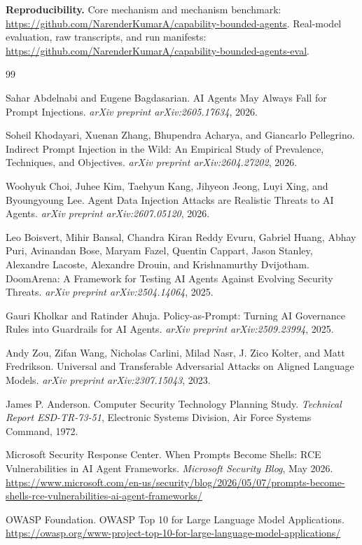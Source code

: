 \documentclass[11pt]{article}
\begin{document}
\bigskip
\noindent\textbf{Reproducibility.} Core mechanism and mechanism benchmark:
\url{https://github.com/NarenderKumarA/capability-bounded-agents}. Real-model evaluation,
raw transcripts, and run manifests:
\url{https://github.com/NarenderKumarA/capability-bounded-agents-eval}.

\begin{thebibliography}{99}

Sahar Abdelnabi and Eugene Bagdasarian.
\newblock AI Agents May Always Fall for Prompt Injections.
\newblock \emph{arXiv preprint arXiv:2605.17634}, 2026.

Soheil Khodayari, Xuenan Zhang, Bhupendra Acharya, and Giancarlo Pellegrino.
\newblock Indirect Prompt Injection in the Wild: An Empirical Study of Prevalence,
Techniques, and Objectives.
\newblock \emph{arXiv preprint arXiv:2604.27202}, 2026.

Woohyuk Choi, Juhee Kim, Taehyun Kang, Jihyeon Jeong, Luyi Xing, and Byoungyoung Lee.
\newblock Agent Data Injection Attacks are Realistic Threats to AI Agents.
\newblock \emph{arXiv preprint arXiv:2607.05120}, 2026.

Leo Boisvert, Mihir Bansal, Chandra Kiran Reddy Evuru, Gabriel Huang, Abhay Puri,
Avinandan Bose, Maryam Fazel, Quentin Cappart, Jason Stanley, Alexandre Lacoste,
Alexandre Drouin, and Krishnamurthy Dvijotham.
\newblock DoomArena: A Framework for Testing AI Agents Against Evolving Security Threats.
\newblock \emph{arXiv preprint arXiv:2504.14064}, 2025.

Gauri Kholkar and Ratinder Ahuja.
\newblock Policy-as-Prompt: Turning AI Governance Rules into Guardrails for AI Agents.
\newblock \emph{arXiv preprint arXiv:2509.23994}, 2025.

Andy Zou, Zifan Wang, Nicholas Carlini, Milad Nasr, J. Zico Kolter, and Matt Fredrikson.
\newblock Universal and Transferable Adversarial Attacks on Aligned Language Models.
\newblock \emph{arXiv preprint arXiv:2307.15043}, 2023.

James P. Anderson.
\newblock Computer Security Technology Planning Study.
\newblock \emph{Technical Report ESD-TR-73-51}, Electronic Systems Division, Air Force
Systems Command, 1972.

Microsoft Security Response Center.
\newblock When Prompts Become Shells: RCE Vulnerabilities in AI Agent Frameworks.
\newblock \emph{Microsoft Security Blog}, May 2026.
\newblock \url{https://www.microsoft.com/en-us/security/blog/2026/05/07/prompts-become-shells-rce-vulnerabilities-ai-agent-frameworks/}

OWASP Foundation.
\newblock OWASP Top 10 for Large Language Model Applications.
\newblock \url{https://owasp.org/www-project-top-10-for-large-language-model-applications/}

\end{thebibliography}
\end{document}
